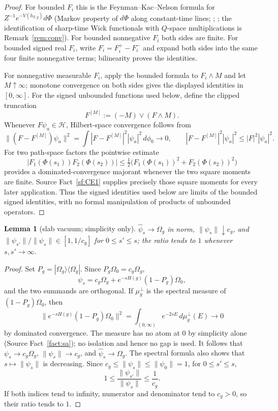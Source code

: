 \documentclass[11pt,a4paper]{article}
\theoremstyle{plain}
\newtheorem{lemma}[theorem]{Lemma}
\theoremstyle{definition}
\newcommand{\HH}{\mathcal{H}}
\newcommand{\Om}{\Omega}
\begin{document}
\begin{proof}
For bounded $F_i$ this is the Feynman--Kac--Nelson formula for
$Z^{-1}e^{-V(h_{T,g})}d\Phi$ (Markov property of $d\Phi$ along constant-time lines;
\cite[Thm.~III.6, Cor.~V.14, Thm.~V.15]{SimonBook};
\cite[Thms.~II.14, II.16]{GRS75}; the identification of sharp-time Wick functionals with
$Q$-space multiplications is Remark~\ref{rem:conv}). For bounded nonnegative $F_i$ both sides
are finite. For bounded signed real $F_i$, write $F_i=F_i^+-F_i^-$ and expand both sides into
the same four finite nonnegative terms; bilinearity proves the identities.

For nonnegative measurable $F_i$, apply the bounded formula to $F_i\wedge M$ and let
$M\uparrow\infty$; monotone convergence on both sides gives the displayed identities in
$[0,\infty]$. For the signed unbounded functions used below, define the clipped truncation
\[
  F^{[M]}:=(-M)\vee(F\wedge M).
\]
Whenever $F\psi_a\in\HH$, Hilbert-space convergence follows from
\[
 \|(F-F^{[M]})\psi_a\|^2
 =\int |F-F^{[M]}|^2|\psi_a|^2\,d\phi_0\longrightarrow0,
 \qquad |F-F^{[M]}|^2|\psi_a|^2\le |F|^2|\psi_a|^2.
\]
For two path-space factors the pointwise estimate
\[
 |F_1(\Phi(s_1))F_2(\Phi(s_2))|
 \le\tfrac12\bigl(F_1(\Phi(s_1))^2+F_2(\Phi(s_2))^2\bigr)
\]
provides a dominated-convergence majorant whenever the two square moments are finite. Source
Fact~\ref{sf:CE1} supplies precisely those square moments for every later application. Thus the
signed identities used below are limits of the bounded signed identities, with no formal
manipulation of products of unbounded operators.
\end{proof}

\begin{lemma}[slab vacuum; simplicity only]\label{lem:vac-main}
$\hat\psi_s\to\Om_g$ in norm, $\|\psi_s\|\downarrow c_g$, and
$\|\psi_{s'}\|/\|\psi_s\|\in[1,1/c_g]$ for $0\le s'\le s$; the ratio tends to $1$ whenever
$s,s'\to\infty$.
\end{lemma}

\begin{proof}
Set $P_g=|\Om_g\rangle\langle\Om_g|$. Since
$P_g\Om_0=c_g\Om_g$,
\[
 \psi_s=c_g\Om_g+e^{-sH(g)}(1-P_g)\Om_0,
\]
and the two summands are orthogonal. If $\mu_g^\perp$ is the spectral measure of
$(1-P_g)\Om_0$, then
\[
 \|e^{-sH(g)}(1-P_g)\Om_0\|^2
 =\int_{(0,\infty)}e^{-2sE}\,d\mu_g^\perp(E)\longrightarrow0
\]
by dominated convergence. The measure has no atom at $0$ by simplicity alone
(Source Fact~\ref{fact:sa}); no isolation and hence no gap is used. It follows that
$\psi_s\to c_g\Om_g$, $\|\psi_s\|\to c_g$, and $\hat\psi_s\to\Om_g$. The spectral formula also
shows that $s\mapsto\|\psi_s\|$ is decreasing. Since
$c_g\le\|\psi_s\|\le\|\psi_0\|=1$, for $0\le s'\le s$,
\[
 1\le\frac{\|\psi_{s'}\|}{\|\psi_s\|}\le\frac1{c_g}.
\]
If both indices tend to infinity, numerator and denominator tend to $c_g>0$, so their ratio
tends to $1$.
\end{proof}
\end{document}
